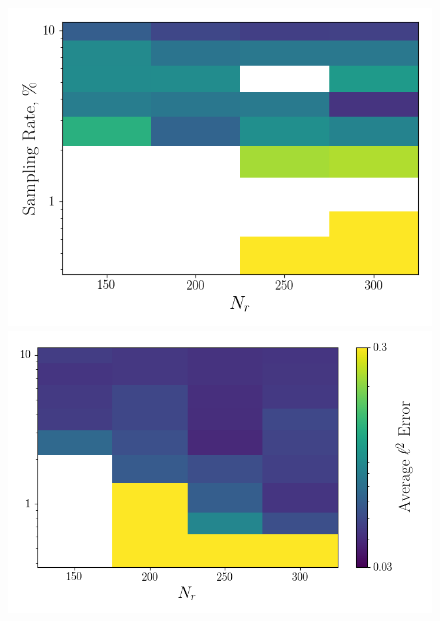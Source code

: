 \begin{figure}
	\begin{minipage}{0.46\linewidth}
		\includegraphics[width=0.99\linewidth]{Chapters/CavityAndCVRC/Images/cavity/deim/err_contour_random_dt2p5e-6.png}
	\end{minipage}
	\begin{minipage}{0.53\linewidth}
		\includegraphics[width=0.99\linewidth]{Chapters/CavityAndCVRC/Images/cavity/deim/err_contour_eigenvec_dt2p5e-6.png}
	\end{minipage}


\end{figure}
